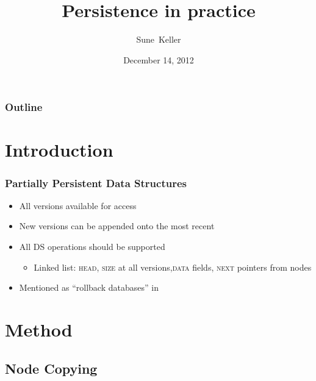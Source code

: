 \documentclass[compress]{beamer}
\title{Persistence in practice}
\author{Sune~Keller}
\date{December 14, 2012}
\begin{document}
\begin{frame}
\titlepage
\end{frame}

\begin{frame}
\frametitle{Outline}
\tableofcontents[pausesections]
\end{frame}


\section{Introduction}

\begin{frame}
\frametitle{Partially Persistent Data Structures}
\begin{itemize}
  \item All versions available for access
  \pause
  \item New versions can be appended onto the most recent
  \pause
  \item All DS operations should be supported
  \pause
  \begin{itemize}
    \item Linked list: \textsc{head}, \textsc{size} at all versions,\newline\hphantom{Linked list: }\textsc{data} fields, \textsc{next} pointers from nodes
  \end{itemize}
  \pause
  \item Mentioned as ``rollback databases'' in \cite{10.1109/AFIPS.1987.11}
\end{itemize}
\end{frame}

\section{Method}

\subsection{Node Copying}
\end{document}
